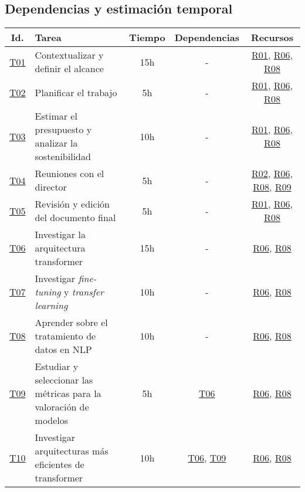 \begin{landscape}
    \begin{table}
    \section{Dependencias y estimación temporal}\label{estimaciontemporal}
    \centering
    \begin{tabular}{ | c | l | c | c | c | }
        \hline
        Id. & Tarea & Tiempo & Dependencias & Recursos \\
        \hline
        \hyperref[T01]{T01} & Contextualizar y definir el alcance & 15h & - & \hyperref[R01]{R01}, \hyperref[R06]{R06}, \hyperref[R08]{R08} \\
        \hline
        \hyperref[T02]{T02} & Planificar el trabajo & 5h & - & \hyperref[R01]{R01}, \hyperref[R06]{R06}, \hyperref[R08]{R08} \\
        \hline
        \hyperref[T03]{T03} & Estimar el presupuesto y analizar la sostenibilidad & 10h & - & \hyperref[R01]{R01}, \hyperref[R06]{R06}, \hyperref[R08]{R08} \\
        \hline
        \hyperref[T04]{T04} & Reuniones con el director & 5h & - & \hyperref[R02]{R02}, \hyperref[R06]{R06}, \hyperref[R08]{R08}, \hyperref[R09]{R09} \\
        \hline
        \hyperref[T05]{T05} & Revisión y edición del documento final & 5h & - & \hyperref[R01]{R01}, \hyperref[R06]{R06}, \hyperref[R08]{R08} \\
        \hline
        \hyperref[T06]{T06} & Investigar la arquitectura transformer & 15h & - & \hyperref[R06]{R06}, \hyperref[R08]{R08} \\
        \hline
        \hyperref[T07]{T07} & Investigar \textit{fine-tuning} y \textit{transfer learning} & 10h & - & \hyperref[R06]{R06}, \hyperref[R08]{R08} \\
        \hline
        \hyperref[T08]{T08} & Aprender sobre el tratamiento de datos en NLP & 10h & - & \hyperref[R06]{R06}, \hyperref[R08]{R08} \\
        \hline
        \hyperref[T09]{T09} & Estudiar y seleccionar las métricas para la valoración de
        modelos & 5h & \hyperref[T06]{T06} & \hyperref[R06]{R06}, \hyperref[R08]{R08} \\
        \hline
        \hyperref[T10]{T10} & Investigar arquitecturas más eficientes de transformer & 10h & \hyperref[T06]{T06}, \hyperref[T09]{T09} & \hyperref[R06]{R06}, \hyperref[R08]{R08} \\

\end{tabular}
\end{table}
\end{landscape}
